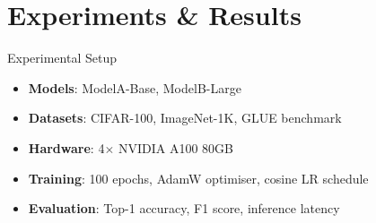 \documentclass{beamer}
\begin{document}
\section[Results]{Experiments \& Results}

\begin{frame}{Experimental Setup}
    \begin{itemize}
        \setlength{\itemsep}{0.7em}
        \item \textcolor{ECNURed}{\textbf{Models}}: ModelA-Base, ModelB-Large
        \item \textcolor{ECNURed}{\textbf{Datasets}}: CIFAR-100, ImageNet-1K, GLUE benchmark
        \item \textcolor{ECNURed}{\textbf{Hardware}}: 4\(\times\) NVIDIA A100 80GB
        \item \textcolor{ECNURed}{\textbf{Training}}: 100 epochs, AdamW optimiser, cosine LR schedule
        \item \textcolor{ECNURed}{\textbf{Evaluation}}: Top-1 accuracy, F1 score, inference latency
    \end{itemize}
\end{frame}
\end{document}
